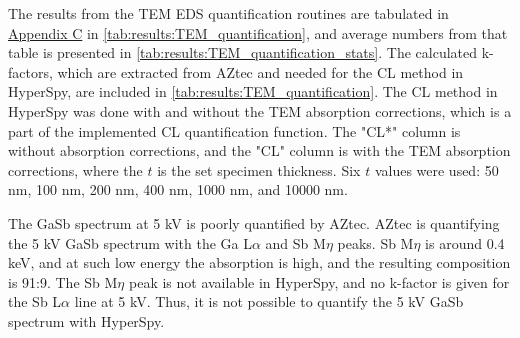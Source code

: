 The results from the TEM EDS quantification routines are tabulated in \hyperref[appendix:tables]{Appendix C} in \cref{tab:results:TEM_quantification}, and average numbers from that table is presented in \cref{tab:results:TEM_quantification_stats}.
The calculated k-factors, which are extracted from AZtec and needed for the CL method in HyperSpy, are included in \cref{tab:results:TEM_quantification}.
The CL method in HyperSpy was done with and without the TEM absorption corrections, which is a part of the implemented CL quantification function.
The "CL*" column is without absorption corrections, and the "CL" column is with the TEM absorption corrections, where the $t$ is the set specimen thickness.
Six $t$ values were used: 50 nm, 100 nm, 200 nm, 400 nm, 1000 nm, and 10000 nm.


The GaSb spectrum at 5 kV is poorly quantified by AZtec.
AZtec is quantifying the 5 kV GaSb spectrum with the Ga L$\alpha$ and Sb M$\eta$ peaks.
Sb M$\eta$ is around 0.4 keV, and at such low energy the absorption is high, and the resulting composition is 91:9.
The Sb M$\eta$ peak is not available in HyperSpy, and no k-factor is given for the Sb L$\alpha$ line at 5 kV.
Thus, it is not possible to quantify the 5 kV GaSb spectrum with HyperSpy.


